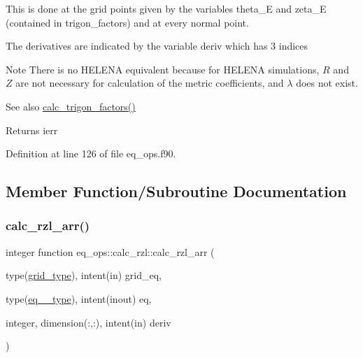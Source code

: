 This is done at the grid points given by the variables {\ttfamily theta\+\_\+E} and {\ttfamily zeta\+\_\+E} (contained in {\ttfamily trigon\+\_\+factors}) and at every normal point.

The derivatives are indicated by the variable {\ttfamily deriv} which has 3 indices

\begin{DoxyNote}{Note}
There is no H\+E\+L\+E\+NA equivalent because for H\+E\+L\+E\+NA simulations, $R$ and $Z$ are not necessary for calculation of the metric coefficients, and $\lambda$ does not exist.
\end{DoxyNote}
\begin{DoxySeeAlso}{See also}
\hyperlink{namespacevmec__utilities_ac699116fc25fdea3e28e488513d97c87}{calc\+\_\+trigon\+\_\+factors()}
\end{DoxySeeAlso}
\begin{DoxyReturn}{Returns}
ierr 
\end{DoxyReturn}


Definition at line 126 of file eq\+\_\+ops.\+f90.



\subsection{Member Function/\+Subroutine Documentation}
\mbox{\label{interfaceeq__ops_1_1calc__rzl_ab117adebbc8a50ce2ef9c9dfa96674bb}} 
\subsubsection{\texorpdfstring{calc\+\_\+rzl\+\_\+arr()}{calc\_rzl\_arr()}\hspace{0.1cm}{\footnotesize\ttfamily [1/2]}}
{\footnotesize\ttfamily integer function eq\+\_\+ops\+::calc\+\_\+rzl\+::calc\+\_\+rzl\+\_\+arr (\begin{DoxyParamCaption}\item[{type(\hyperlink{structgrid__vars_1_1grid__type}{grid\+\_\+type}), intent(in)}]{grid\+\_\+eq,  }\item[{type(\hyperlink{structeq__vars_1_1eq__2__type}{eq\+\_\+2\+\_\+type}), intent(inout)}]{eq,  }\item[{integer, dimension(\+:,\+:), intent(in)}]{deriv }\end{DoxyParamCaption})}



